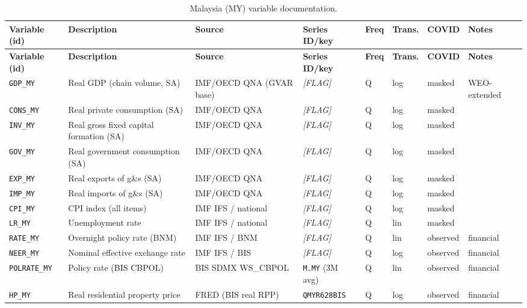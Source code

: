 {\footnotesize
\begin{longtable}{p{2.3cm}p{3.3cm}p{2.1cm}p{2.2cm}p{0.6cm}p{1.4cm}p{1.9cm}p{2.4cm}}
\caption{Malaysia (MY) variable documentation.}\label{tab:data:MY}\\
\toprule
\textbf{Variable (id)} & \textbf{Description} & \textbf{Source} & \textbf{Series ID/key} & \textbf{Freq} & \textbf{Trans.} & \textbf{COVID} & \textbf{Notes} \\
\midrule
\endfirsthead
\toprule
\textbf{Variable (id)} & \textbf{Description} & \textbf{Source} & \textbf{Series ID/key} & \textbf{Freq} & \textbf{Trans.} & \textbf{COVID} & \textbf{Notes} \\
\midrule
\endhead
\bottomrule
\endfoot
\texttt{GDP\_MY}    & Real GDP (chain volume, SA)        & IMF/OECD QNA (GVAR base) & \textit{[FLAG]} & Q & log & masked & WEO-extended \\
\texttt{CONS\_MY}   & Real private consumption (SA)      & IMF/OECD QNA & \textit{[FLAG]} & Q & log & masked & \\
\texttt{INV\_MY}    & Real gross fixed capital formation (SA) & IMF/OECD QNA & \textit{[FLAG]} & Q & log & masked & \\
\texttt{GOV\_MY}    & Real government consumption (SA)   & IMF/OECD QNA & \textit{[FLAG]} & Q & log & masked & \\
\texttt{EXP\_MY}    & Real exports of g\&s (SA)          & IMF/OECD QNA & \textit{[FLAG]} & Q & log & masked & \\
\texttt{IMP\_MY}    & Real imports of g\&s (SA)          & IMF/OECD QNA & \textit{[FLAG]} & Q & log & masked & \\
\texttt{CPI\_MY}    & CPI index (all items)              & IMF IFS / national & \textit{[FLAG]} & Q & log & masked & \\
\texttt{LR\_MY}     & Unemployment rate                  & IMF IFS / national & \textit{[FLAG]} & Q & lin & masked & \\
\texttt{RATE\_MY}   & Overnight policy rate (BNM)        & IMF IFS / BNM & \textit{[FLAG]} & Q & lin & observed & financial \\
\texttt{NEER\_MY}   & Nominal effective exchange rate    & IMF IFS / BIS & \textit{[FLAG]} & Q & log & observed & financial \\
\texttt{POLRATE\_MY}& Policy rate (BIS CBPOL)            & BIS SDMX WS\_CBPOL & \texttt{M.MY} (3M avg) & Q & lin & observed & financial \\
\texttt{HP\_MY}     & Real residential property price    & FRED (BIS real RPP) & \texttt{QMYR628BIS} & Q & log & observed & financial \\

\end{longtable}}
